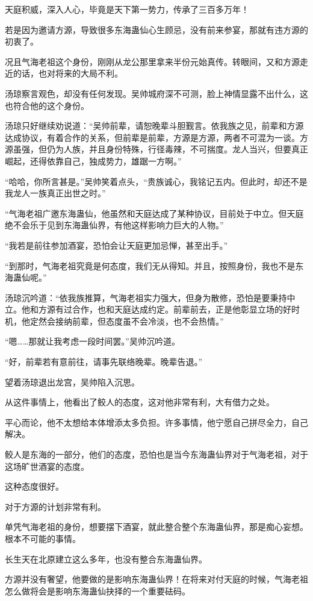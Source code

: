 \begin{this_body}
天庭积威，深入人心，毕竟是天下第一势力，传承了三百多万年！

若是因为邀请方源，导致很多东海蛊仙心生顾忌，没有前来参宴，那就有违方源的初衷了。

况且气海老祖这个身份，刚刚从龙公那里拿来半份元始真传。转眼间，又和方源走近的话，也对将来的大局不利。

汤琼察言观色，却没有任何发现。吴帅城府深不可测，脸上神情显露不出什么，这也符合他的这个身份。

汤琼只好继续劝说道：“吴帅前辈，请恕晚辈斗胆觐言。依我族之见，前辈和方源达成协议，有着合作的关系，但前辈是前辈，方源是方源，两者不可混为一谈。方源虽强，但仍为人族，并且身份特殊，行径毒辣，不可揣度。龙人当兴，但要真正崛起，还得依靠自己，独成势力，雄踞一方啊。”

“哈哈，你所言甚是。”吴帅笑着点头，“贵族诚心，我铭记五内。但此时，却还不是我龙人一族真正出世之时。”

“气海老祖广邀东海蛊仙，他虽然和天庭达成了某种协议，目前处于中立。但天庭绝不会乐于见到东海蛊仙界，有他这样影响力巨大的人物。”

“我若是前往参加酒宴，恐怕会让天庭更加忌惮，甚至出手。”

“到那时，气海老祖究竟是何态度，我们无从得知。并且，按照身份，我也不是东海蛊仙呢。”

汤琼沉吟道：“依我族推算，气海老祖实力强大，但身为散修，恐怕是要秉持中立。他和方源有过合作，也和天庭达成约定。前辈前去，正是他彰显立场的好时机，他定然会接纳前辈，但态度虽不会冷淡，也不会热情。”

“嗯……那就让我考虑一段时间罢。”吴帅沉吟道。

“好，前辈若有意前往，请事先联络晚辈。晚辈告退。”

望着汤琼退出龙宫，吴帅陷入沉思。

从这件事情上，他看出了鲛人的态度，这对他非常有利，大有借力之处。

平心而论，他不太想给本体增添太多负担。许多事情，他宁愿自己拼尽全力，自己解决。

鲛人是东海的一部分，他们的态度，恐怕也是当今东海蛊仙界对于气海老祖，对于这场旷世酒宴的态度。

这种态度很好。

对于方源的计划非常有利。

单凭气海老祖的身份，想要摆下酒宴，就此整合整个东海蛊仙界，那是痴心妄想。根本不可能的事情。

长生天在北原建立这么多年，也没有整合东海蛊仙界。

方源并没有奢望，他要做的是影响东海蛊仙界！在将来对付天庭的时候，气海老祖怎么做将会是影响东海蛊仙抉择的一个重要砝码。


\end{this_body}
